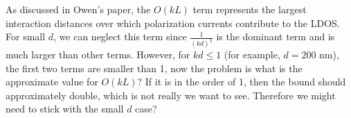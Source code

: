 \documentclass[12pt]{article}
\begin{document}
As discussed in Owen's paper, the $O(kL)$ term represents the largest interaction distances over which polarization currents contribute to the LDOS. For small $d$, we can neglect this term since $\frac{1}{(kd)^3}$ is the dominant term and is much larger than other terms. However, for $kd\leq 1$ (for example, $d=200$ nm), the first two terms are smaller than 1, now the problem is what is the approximate value for $O(kL)$? If it is in the order of 1, then the bound should approximately double, which is not really we want to see. Therefore we might need to stick with the small $d$ case?
%
%
%
\end{document}
